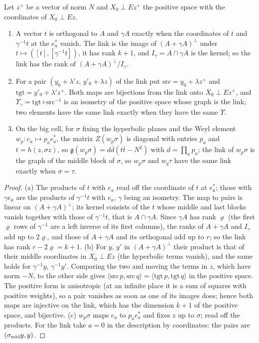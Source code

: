 \begin{lemma}\label{lem:link-isometry}
Let $z^+$ be a vector of norm $N$ and $X_0\perp Ez^+$ the positive space with the coordinates of $X_0\perp Ez$.
\begin{enumerate}[label=\textup{(\alph*)}]
\item A vector $t$ is orthogonal to $A$ and $\gamma A$ exactly when the coordinates of $t$ and $\gamma^{-1}t$ at the $e^*_a$ vanish. The link is the image of $(A+\gamma A)^\perp$ under $t\mapsto([t],[\gamma^{-1}t])$, it has rank $k+1$, and
$I_\gamma=A\cap\gamma A$ is the kernel; so the link has the rank of $(A+\gamma A)^\perp/I_\gamma$.
\item For a pair $(y_0+\lambda'z,\,y'_0+\lambda z)$ of the link put $\mathrm{src}=y_0+\lambda z^+$ and $\mathrm{tgt}=y'_0+\lambda'z^+$. Both maps are bijections from the link onto $X_0\perp Ez^+$, and $\Upsilon_\gamma=\mathrm{tgt}\circ\mathrm{src}^{-1}$ is an
isometry of the positive space whose graph is the link; two elements have the same link exactly when they have the same $\Upsilon$.
\item On the big cell, for $\sigma$ fixing the hyperbolic planes and the Weyl element $w_p\colon e_a\mapsto p_ae^*_a$, the matrix $Z(w_p\sigma)$ is diagonal with entries $p_a$ and $t=h(z,\sigma z)$, so $\mathfrak g(w_p\sigma)=d\bar d(t\bar t-N^2)$ with
$d=\prod_ap_a$; the link of $w_p\sigma$ is the graph of the middle block of $\sigma$, so $w_p\sigma$ and $w_q\tau$ have the same link exactly when $\sigma=\tau$.
\end{enumerate}
\end{lemma}

\begin{proof}
(a) The products of $t$ with $e_a$ read off the coordinate of $t$ at $e^*_a$; those with $\gamma e_a$ are the products of $\gamma^{-1}t$ with $e_a$, $\gamma$ being an isometry. The map to pairs is linear on $(A+\gamma A)^\perp$; its kernel consists of the $t$
whose middle and last blocks vanish together with those of $\gamma^{-1}t$, that is $A\cap\gamma A$. Since $\gamma A$ has rank $\varrho$ (the first $\varrho$ rows of $\gamma^{-1}$ are a left inverse of its first columns), the ranks of $A+\gamma A$ and $I_\gamma$ add up to
$2\varrho$, and those of $A+\gamma A$ and its orthogonal add up to $r$; so the link has rank $r-2\varrho=k+1$. (b) For $y$, $y'$ in $(A+\gamma A)^\perp$ their product is that of their middle coordinates in $X_0\perp Ez$ (the hyperbolic terms vanish), and the
same holds for $\gamma^{-1}y$, $\gamma^{-1}y'$. Comparing the two and moving the terms in $z$, which have norm $-N$, to the other side gives $\langle\mathrm{src}\,p,\mathrm{src}\,q\rangle=\langle\mathrm{tgt}\,p,\mathrm{tgt}\,q\rangle$ in the positive space. The positive form is
anisotropic (at an infinite place it is a sum of squares with positive weights), so a pair vanishes as soon as one of its images does; hence both maps are injective on the link, which has the dimension $k+1$ of the positive space, and bijective.
(c) $w_p\sigma$ maps $e_a$ to $p_ae^*_a$ and fixes $z$ up to $\sigma$; read off the products. For the link take $a=0$ in the description by coordinates: the pairs are $(\sigma_{\rm mid}y,y)$.
\end{proof}

